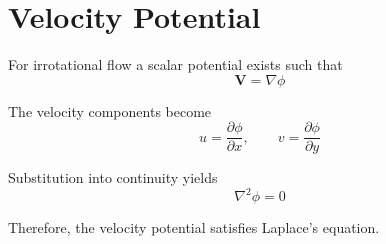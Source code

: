 \section{Velocity Potential}
\label{sec:velocity-potential}

For irrotational flow a scalar potential exists such that
\[
\mathbf{V}=\nabla \phi
\]

The velocity components become
\[
u=\frac{\partial \phi}{\partial x},
\qquad
v=\frac{\partial \phi}{\partial y}
\]

Substitution into continuity yields
\[
\nabla^2 \phi =0
\]

Therefore, the velocity potential satisfies Laplace's equation.
